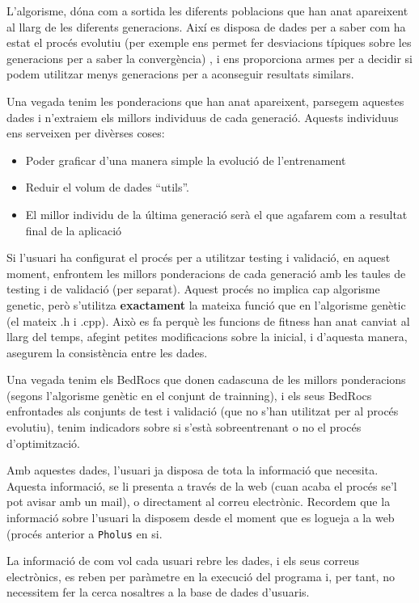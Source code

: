\documentclass[titlepage,a4paper,12pt]{book}
\begin{document}
L'algorisme, dóna com a sortida les diferents poblacions que han anat apareixent
al llarg de les diferents generacions.  Així es disposa de dades per a saber com
ha estat el procés evolutiu (per exemple ens permet fer desviacions típiques
sobre les generacions per a saber la convergència) , i ens proporciona armes per
a decidir si podem utilitzar menys generacions per a aconseguir resultats
similars.

Una vegada tenim les ponderacions que han anat apareixent, parsegem aquestes
dades i n'extraiem els millors individuus de cada generació.  Aquests individuus
ens serveixen per divèrses coses:

\begin{itemize}
	\item Poder graficar d'una manera simple la evolució de l'entrenament
	\item Reduir el volum de dades ``utils''.
	\item El millor individu de la última generació serà el que agafarem com a
	resultat final de la aplicació
\end{itemize}

Si l'usuari ha configurat el procés per a utilitzar testing i validació, en
aquest moment, enfrontem les millors ponderacions de cada generació amb les
taules de testing i de validació (per separat).  Aquest procés no implica cap
algorisme genetic, però s'utilitza \textbf{exactament} la mateixa funció que en
l'algorisme genètic (el mateix .h i .cpp).  Això es fa perquè les funcions de
fitness han anat canviat al llarg del temps, afegint petites modificacions sobre
la inicial, i d'aquesta manera, asegurem la consistència entre les dades.

Una vegada tenim els BedRocs que donen cadascuna de les millors ponderacions
(segons l'algorisme genètic en el conjunt de trainning), i els seus BedRocs
enfrontades als conjunts de test i validació (que no s'han utilitzat per al
procés evolutiu), tenim indicadors sobre si s'està sobreentrenant o no el procés
d'optimització.

Amb aquestes dades, l'usuari ja disposa de tota la informació que necesita.
Aquesta informació, se li presenta a través de la web (cuan acaba el procés se'l
pot avisar amb un mail), o directament al correu electrònic.  Recordem que la
informació sobre l'usuari la disposem desde el moment que es logueja a la web
(procés anterior a \texttt{Pholus} en si.

La informació de com vol cada usuari rebre les dades, i els seus correus
electrònics, es reben per paràmetre en la execució del programa i, per tant, no
necessitem fer la cerca nosaltres a la base de dades d'usuaris.
\end{document}
